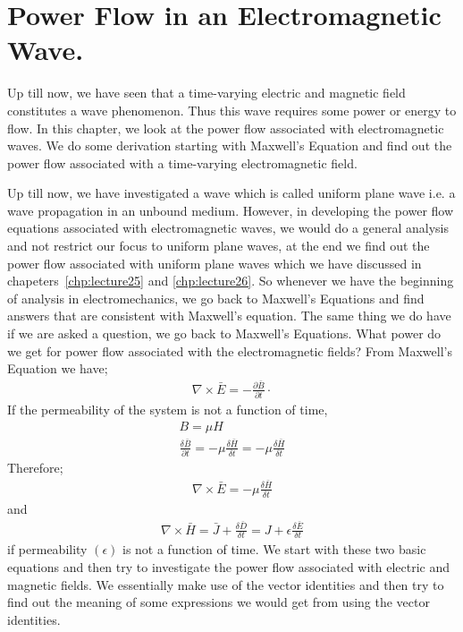 \chapter{Power Flow in an Electromagnetic Wave.}
Up till now, we have seen that a time-varying electric and magnetic field constitutes a wave phenomenon. Thus this wave requires some power or energy to flow. In this chapter, we look at the power flow associated with electromagnetic waves. We do some derivation starting with Maxwell's Equation and find out the power flow associated with a time-varying electromagnetic field.

Up till now, we have investigated a wave which is called uniform plane wave i.e. a wave propagation in an unbound medium. However, in developing the power flow equations associated with electromagnetic waves, we would do a general analysis and not restrict our focus to uniform plane waves, at the end we find out the power flow associated with uniform plane waves which we have discussed in chapeters~\ref{chp:lecture25} and \ref{chp:lecture26}. So whenever we have the beginning of analysis in electromechanics, we go back to Maxwell's Equations and find answers that are consistent with Maxwell's equation. The same thing we do have if we are asked a question, we go back to Maxwell's Equations. What power do we get for power flow associated with the electromagnetic fields? From Maxwell's Equation we have;
\begin{align}
\nabla\times\bar{E}=-\frac{\partial\bar{B}}{\partial t} \cdot 
\end{align} 
If the permeability of the system is not a function of time,
\begin{align}
B=\mu H\\
\frac{\delta\bar{B}}{\partial t}= -\mu\frac{\delta\bar{H}}{\delta t} =  - \mu\frac{\delta\bar{H}}{\delta t}
\end{align}
Therefore;
\begin{align}
\nabla\times\bar{E} = -\mu \frac{\delta\bar{H}}{\delta t} 
\end{align} 
and 
\begin{align}
\nabla\times\bar{H} =\bar{J} + \frac{\delta\bar{D}}{\delta t}  =  J + \epsilon\frac{\delta\bar{E}}{\delta t} 
\end{align}
if permeability  $(\epsilon) $ is not a function of time.
We start with these two basic equations and then try to investigate the power flow associated with electric and magnetic fields. We essentially make use of the vector identities and then try to find out the meaning of some expressions we would get from using the vector identities.

